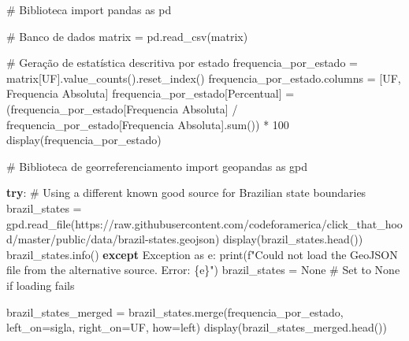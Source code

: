 \documentclass[
  brazilian,
  letterpaper,
  DIV=11,
  numbers=noendperiod]{scrartcl}
\newenvironment{Shaded}{\begin{snugshade}}{\end{snugshade}}
\newcommand{\BuiltInTok}[1]{\textcolor[rgb]{0.00,0.23,0.31}{#1}}
\newcommand{\CommentTok}[1]{\textcolor[rgb]{0.37,0.37,0.37}{#1}}
\newcommand{\ControlFlowTok}[1]{\textcolor[rgb]{0.00,0.23,0.31}{\textbf{#1}}}
\newcommand{\DecValTok}[1]{\textcolor[rgb]{0.68,0.00,0.00}{#1}}
\newcommand{\ImportTok}[1]{\textcolor[rgb]{0.00,0.46,0.62}{#1}}
\newcommand{\NormalTok}[1]{\textcolor[rgb]{0.00,0.23,0.31}{#1}}
\newcommand{\OperatorTok}[1]{\textcolor[rgb]{0.37,0.37,0.37}{#1}}
\newcommand{\PreprocessorTok}[1]{\textcolor[rgb]{0.68,0.00,0.00}{#1}}
\newcommand{\SpecialCharTok}[1]{\textcolor[rgb]{0.37,0.37,0.37}{#1}}
\newcommand{\SpecialStringTok}[1]{\textcolor[rgb]{0.13,0.47,0.30}{#1}}
\newcommand{\StringTok}[1]{\textcolor[rgb]{0.13,0.47,0.30}{#1}}
\newcommand{\VariableTok}[1]{\textcolor[rgb]{0.07,0.07,0.07}{#1}}
\begin{document}
\begin{Shaded}
\begin{Highlighting}[]
\CommentTok{\# Biblioteca}
\ImportTok{import}\NormalTok{ pandas }\ImportTok{as}\NormalTok{ pd}

\CommentTok{\# Banco de dados}
\NormalTok{matrix }\OperatorTok{=}\NormalTok{ pd.read\_csv(}\StringTok{\textquotesingle{}matrix\textquotesingle{}}\NormalTok{)}

\CommentTok{\# Geração de estatística descritiva por estado}
\NormalTok{frequencia\_por\_estado }\OperatorTok{=}\NormalTok{ matrix[}\StringTok{\textquotesingle{}UF\textquotesingle{}}\NormalTok{].value\_counts().reset\_index()}
\NormalTok{frequencia\_por\_estado.columns }\OperatorTok{=}\NormalTok{ [}\StringTok{\textquotesingle{}UF\textquotesingle{}}\NormalTok{, }\StringTok{\textquotesingle{}Frequencia Absoluta\textquotesingle{}}\NormalTok{]}
\NormalTok{frequencia\_por\_estado[}\StringTok{\textquotesingle{}Percentual\textquotesingle{}}\NormalTok{] }\OperatorTok{=}\NormalTok{ (frequencia\_por\_estado[}\StringTok{\textquotesingle{}Frequencia Absoluta\textquotesingle{}}\NormalTok{] }\OperatorTok{/}\NormalTok{ frequencia\_por\_estado[}\StringTok{\textquotesingle{}Frequencia Absoluta\textquotesingle{}}\NormalTok{].}\BuiltInTok{sum}\NormalTok{()) }\OperatorTok{*} \DecValTok{100}
\NormalTok{display(frequencia\_por\_estado)}

\CommentTok{\# Biblioteca de georreferenciamento}
\ImportTok{import}\NormalTok{ geopandas }\ImportTok{as}\NormalTok{ gpd}

\ControlFlowTok{try}\NormalTok{:}
    \CommentTok{\# Using a different known good source for Brazilian state boundaries}
\NormalTok{    brazil\_states }\OperatorTok{=}\NormalTok{ gpd.read\_file(}\StringTok{\textquotesingle{}https://raw.githubusercontent.com/codeforamerica/click\_that\_hood/master/public/data/brazil{-}states.geojson\textquotesingle{}}\NormalTok{)}
\NormalTok{    display(brazil\_states.head())}
\NormalTok{    brazil\_states.info()}
\ControlFlowTok{except} \PreprocessorTok{Exception} \ImportTok{as}\NormalTok{ e:}
    \BuiltInTok{print}\NormalTok{(}\SpecialStringTok{f"Could not load the GeoJSON file from the alternative source. Error: }\SpecialCharTok{\{}\NormalTok{e}\SpecialCharTok{\}}\SpecialStringTok{"}\NormalTok{)}
\NormalTok{    brazil\_states }\OperatorTok{=} \VariableTok{None} \CommentTok{\# Set to None if loading fails}
    
\NormalTok{brazil\_states\_merged }\OperatorTok{=}\NormalTok{ brazil\_states.merge(frequencia\_por\_estado, left\_on}\OperatorTok{=}\StringTok{\textquotesingle{}sigla\textquotesingle{}}\NormalTok{, right\_on}\OperatorTok{=}\StringTok{\textquotesingle{}UF\textquotesingle{}}\NormalTok{, how}\OperatorTok{=}\StringTok{\textquotesingle{}left\textquotesingle{}}\NormalTok{)}
\NormalTok{display(brazil\_states\_merged.head())}


\end{Highlighting}
\end{Shaded}
\end{document}
